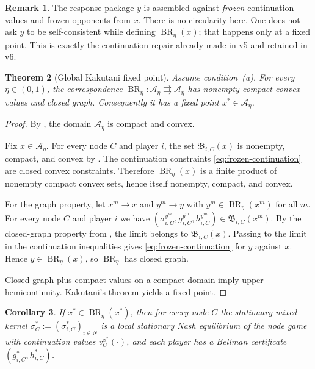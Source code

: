 \documentclass[12pt]{article}
\newtheorem{theorem}{Theorem}[section]
\newtheorem{corollary}[theorem]{Corollary}
\theoremstyle{definition}
\newtheorem{remark}[theorem]{Remark}
\newcommand{\1}{\mathbf{1}}
\newcommand{\cA}{\mathcal{A}}
\DeclareMathOperator{\BR}{BR}
\begin{document}
\begin{remark}
The response package $y$ is assembled against \emph{frozen} continuation values and
frozen opponents from $x$. There is no circularity here. One does not ask $y$ to
be self-consistent while defining $\BR_\eta(x)$; that happens only at a fixed
point. This is exactly the continuation repair already made in v5 and retained in
v6.
\end{remark}

\begin{theorem}[Global Kakutani fixed point]
\label{thm:kakutani-global}
Assume condition~\textnormal{(a)}. For every $\eta\in(0,1)$, the correspondence
$\BR_\eta:\cA_\eta\rightrightarrows\cA_\eta$ has nonempty compact convex values and
closed graph. Consequently it has a fixed point $x^*\in\cA_\eta$.
\end{theorem}

\begin{proof}
By , the domain $\cA_\eta$ is compact and convex.

Fix $x\in\cA_\eta$. For every node $C$ and player $i$, the set
$\mathfrak B_{i,C}(x)$ is nonempty, compact, and convex by
. The continuation constraints
\eqref{eq:frozen-continuation} are closed convex constraints. Therefore
$\BR_\eta(x)$ is a finite product of nonempty compact convex sets, hence itself
nonempty, compact, and convex.

For the graph property, let $x^m\to x$ and $y^m\to y$ with
$y^m\in\BR_\eta(x^m)$ for all $m$. For every node $C$ and player $i$ we have
$(\sigma_{i,C}^{y^m},g_{i,C}^{y^m},h_{i,C}^{y^m})\in\mathfrak B_{i,C}(x^m)$. By
the closed-graph property from , the limit belongs to
$\mathfrak B_{i,C}(x)$. Passing to the limit in the continuation inequalities gives
\eqref{eq:frozen-continuation} for $y$ against $x$. Hence $y\in\BR_\eta(x)$, so
$\BR_\eta$ has closed graph.

Closed graph plus compact values on a compact domain imply upper
hemicontinuity. Kakutani's theorem \cite{Kakutani1941} yields a fixed point.
\end{proof}

\begin{corollary}
\label{cor:local-nash-at-fixed-point}
If $x^*\in\BR_\eta(x^*)$, then for every node $C$ the stationary mixed kernel
$\sigma_C^*:=(\sigma_{i,C}^*)_{i\in N}$ is a local stationary Nash equilibrium of
the node game with continuation values $v_C^{x^*}(\cdot)$, and each player has a
Bellman certificate $(g_{i,C}^*,h_{i,C}^*)$.
\end{corollary}
\end{document}
